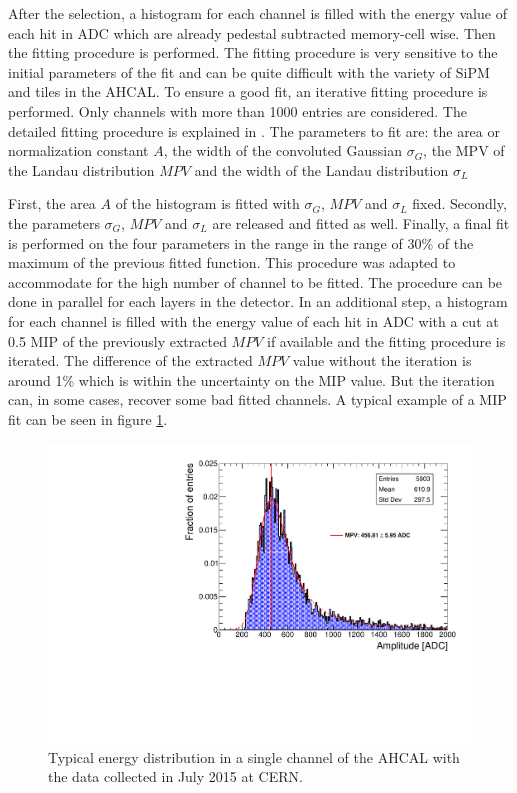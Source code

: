 After the selection, a histogram for each channel is filled with the energy value of each hit in ADC which are already pedestal subtracted memory-cell wise. Then the fitting procedure is performed. The fitting procedure is very sensitive to the initial parameters of the fit and can be quite difficult with the variety of SiPM and tiles in the AHCAL. To ensure a good fit, an iterative fitting procedure is performed. Only channels with more than 1000 entries are considered. The detailed fitting procedure is explained in \cite{FabianThesis}. The parameters to fit are: the area or normalization constant $A$, the width of the convoluted Gaussian $\sigma_G$, the MPV of the Landau distribution $MPV$ and the width of the Landau distribution $\sigma_L$

First, the area $A$ of the histogram is fitted with $\sigma_G$, $MPV$ and $\sigma_L$ fixed. Secondly, the parameters $\sigma_G$, $MPV$ and $\sigma_L$ are released and fitted as well. Finally, a final fit is performed on the four parameters in the range in the range of 30\% of the maximum of the previous fitted function. This procedure was adapted to accommodate for the high number of channel to be fitted. The procedure can be done in parallel for each layers in the detector. In an additional step, a histogram for each channel is filled with the energy value of each hit in ADC with a cut at 0.5 MIP of the previously extracted $MPV$ if available and the fitting procedure is iterated. The difference of the extracted $MPV$ value without the iteration is around 1\% which is within the uncertainty on the MIP value. But the iteration can, in some cases, recover some bad fitted channels. A typical example of a MIP fit can be seen in figure \ref{fig:MIPFit}.

\begin{figure}[htbp!]
	\centering
	\includegraphics[width=0.7\linewidth]{../Thesis_Plots/EnergyCalib/Plots/ExampleMIP_Module3.pdf}
	\caption{Typical energy distribution in a single channel of the AHCAL with the data collected in July 2015 at CERN.} \label{fig:MIPFit}
\end{figure}

